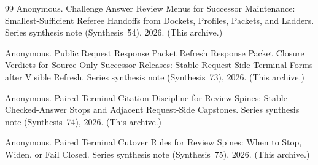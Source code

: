 \documentclass[11pt]{article}
\begin{document}
\begin{thebibliography}{99}
Anonymous.
\newblock Challenge Answer Review Menus for Successor Maintenance: Smallest-Sufficient Referee Handoffs from Dockets, Profiles, Packets, and Ladders.
\newblock Series synthesis note (Synthesis~54), 2026. (This archive.)

Anonymous.
\newblock Public Request Response Packet Refresh Response Packet Closure Verdicts for Source-Only Successor Releases: Stable Request-Side Terminal Forms after Visible Refresh.
\newblock Series synthesis note (Synthesis~73), 2026. (This archive.)

Anonymous.
\newblock Paired Terminal Citation Discipline for Review Spines: Stable Checked-Answer Stops and Adjacent Request-Side Capstones.
\newblock Series synthesis note (Synthesis~74), 2026. (This archive.)

Anonymous.
\newblock Paired Terminal Cutover Rules for Review Spines: When to Stop, Widen, or Fail Closed.
\newblock Series synthesis note (Synthesis~75), 2026. (This archive.)

\end{thebibliography}
\end{document}

